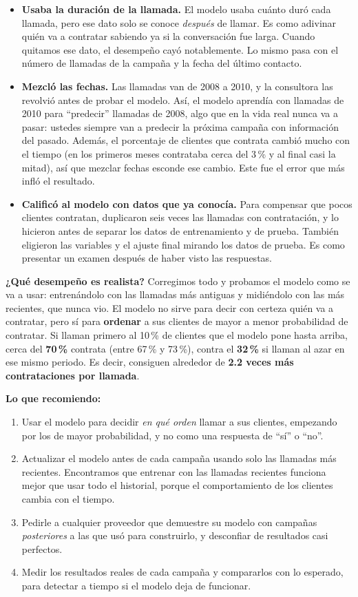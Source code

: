 \documentclass[11pt, letterpaper]{article}
\begin{document}
\begin{itemize}
    \item \textbf{Usaba la duración de la llamada.} El modelo usaba cuánto duró cada llamada, pero ese dato solo se conoce \emph{después} de llamar. Es como adivinar quién va a contratar sabiendo ya si la conversación fue larga. Cuando quitamos ese dato, el desempeño cayó notablemente. Lo mismo pasa con el número de llamadas de la campaña y la fecha del último contacto.
    \item \textbf{Mezcló las fechas.} Las llamadas van de 2008 a 2010, y la consultora las revolvió antes de probar el modelo. Así, el modelo aprendía con llamadas de 2010 para ``predecir'' llamadas de 2008, algo que en la vida real nunca va a pasar: ustedes siempre van a predecir la próxima campaña con información del pasado. Además, el porcentaje de clientes que contrata cambió mucho con el tiempo (en los primeros meses contrataba cerca del 3\,\% y al final casi la mitad), así que mezclar fechas esconde ese cambio. Este fue el error que más infló el resultado.
    \item \textbf{Calificó al modelo con datos que ya conocía.} Para compensar que pocos clientes contratan, duplicaron seis veces las llamadas con contratación, y lo hicieron antes de separar los datos de entrenamiento y de prueba. También eligieron las variables y el ajuste final mirando los datos de prueba. Es como presentar un examen después de haber visto las respuestas.
\end{itemize}

\noindent \textbf{¿Qué desempeño es realista?} Corregimos todo y probamos el modelo como se va a usar: entrenándolo con las llamadas más antiguas y midiéndolo con las más recientes, que nunca vio. El modelo no sirve para decir con certeza quién va a contratar, pero sí para \textbf{ordenar} a sus clientes de mayor a menor probabilidad de contratar. Si llaman primero al 10\,\% de clientes que el modelo pone hasta arriba, cerca del \textbf{70\,\%} contrata (entre 67\,\% y 73\,\%), contra el \textbf{32\,\%} si llaman al azar en ese mismo periodo. Es decir, consiguen alrededor de \textbf{2.2 veces más contrataciones por llamada}.

\medskip
\noindent \textbf{Lo que recomiendo:}
\begin{enumerate}
    \item Usar el modelo para decidir \emph{en qué orden} llamar a sus clientes, empezando por los de mayor probabilidad, y no como una respuesta de ``sí'' o ``no''.
    \item Actualizar el modelo antes de cada campaña usando solo las llamadas más recientes. Encontramos que entrenar con las llamadas recientes funciona mejor que usar todo el historial, porque el comportamiento de los clientes cambia con el tiempo.
    \item Pedirle a cualquier proveedor que demuestre su modelo con campañas \emph{posteriores} a las que usó para construirlo, y desconfiar de resultados casi perfectos.
    \item Medir los resultados reales de cada campaña y compararlos con lo esperado, para detectar a tiempo si el modelo deja de funcionar.
\end{enumerate}
\end{document}
